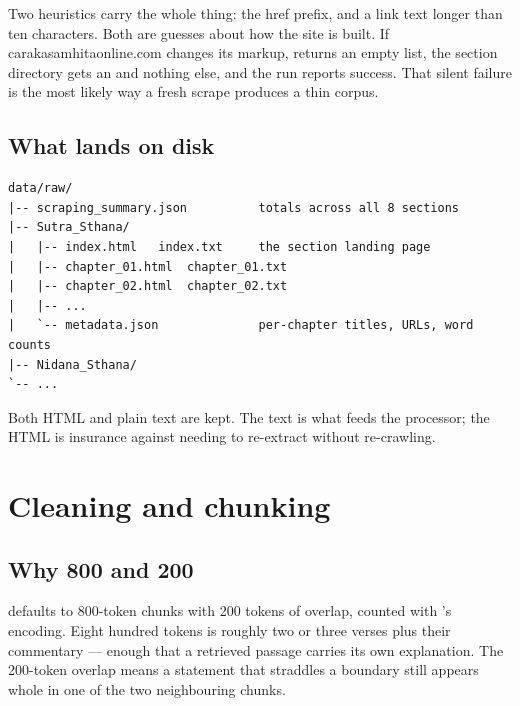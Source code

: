 Two heuristics carry the whole thing: the href prefix, and a link text longer than ten characters. Both are guesses about how the site is built. If carakasamhitaonline.com changes its markup,  returns an empty list, the section directory gets an  and nothing else, and the run reports success. That silent failure is the most likely way a fresh scrape produces a thin corpus.

\subsection{What lands on disk}

\begin{lstlisting}[style=plain]
data/raw/
|-- scraping_summary.json          totals across all 8 sections
|-- Sutra_Sthana/
|   |-- index.html   index.txt     the section landing page
|   |-- chapter_01.html  chapter_01.txt
|   |-- chapter_02.html  chapter_02.txt
|   |-- ...
|   `-- metadata.json              per-chapter titles, URLs, word counts
|-- Nidana_Sthana/
`-- ...
\end{lstlisting}

Both HTML and plain text are kept. The text is what feeds the processor; the HTML is insurance against needing to re-extract without re-crawling.

\section{Cleaning and chunking}

\subsection{Why 800 and 200}

 defaults to 800-token chunks with 200 tokens of overlap, counted with 's  encoding. Eight hundred tokens is roughly two or three verses plus their commentary --- enough that a retrieved passage carries its own explanation. The 200-token overlap means a statement that straddles a boundary still appears whole in one of the two neighbouring chunks.

